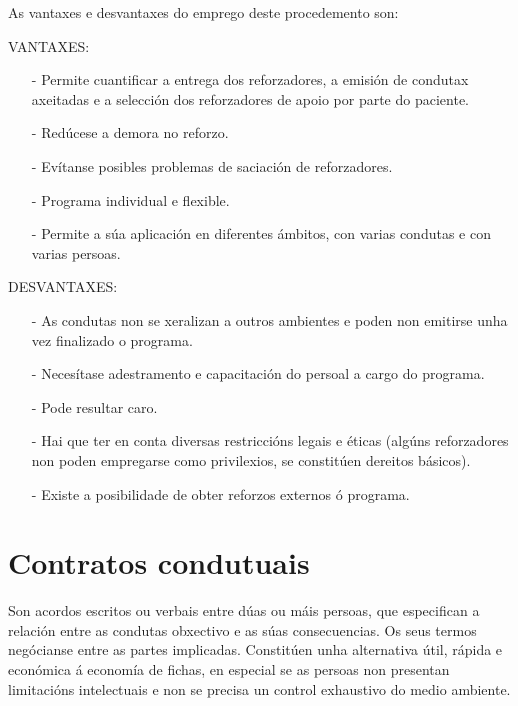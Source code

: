\documentclass[a4paper,11pt]{article}
\begin{document}
As vantaxes e desvantaxes do emprego deste procedemento son:
\begin{multicols}{2}
VANTAXES:
	\begin{itemize}
		\item[-] Permite cuantificar a entrega dos reforzadores, a emisión de condutax axeitadas e a 
		selección dos reforzadores de apoio por parte do paciente.
		\item[-] Redúcese a demora no reforzo.
		\item[-] Evítanse posibles problemas de saciación de reforzadores.
		\item[-] Programa individual e flexible.
		\item[-] Permite a súa aplicación en diferentes ámbitos, con varias condutas e con varias 
		persoas.
		\item[]
		\item[]
	\end{itemize}
	
DESVANTAXES:
	\begin{itemize}
		\item[-] As condutas non se xeralizan a outros ambientes e poden non emitirse unha vez 
		finalizado o programa.
		\item[-] Necesítase adestramento e capacitación do persoal a cargo do programa.
		\item[-] Pode resultar caro.
		\item[-] Hai que ter en conta diversas restriccións legais e éticas (algúns reforzadores non 
		poden empregarse como privilexios, se constitúen dereitos básicos).
		\item[-] Existe a posibilidade de obter reforzos externos ó programa.
	\end{itemize}
\end{multicols}

\section{Contratos condutuais}
Son acordos escritos ou verbais entre dúas ou máis persoas, que especifican a relación entre as condutas obxectivo e as súas consecuencias. Os seus termos negócianse entre as partes implicadas. Constitúen unha alternativa útil, rápida e económica á economía de fichas, en especial se as persoas non presentan limitacións intelectuais e non se precisa un control exhaustivo do medio ambiente.
\end{document}
